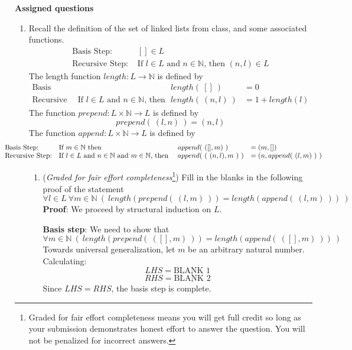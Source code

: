 \documentclass[12pt, oneside]{article}
\begin{document}
\newpage
{\bf Assigned questions}

\begin{enumerate}
    \item Recall the definition of the set of linked lists from class, and some associated functions.
    \[
        \begin{array}{ll}
        \textrm{Basis Step: } & [] \in L \\
        \textrm{Recursive Step: } & \textrm{If } l \in L\textrm{ and }n \in \mathbb{N} \textrm{, then } (n, l) \in L
        \end{array}
    \]
    The length function $length: L \to \mathbb{N}$ is defined by
    \[
        \begin{array}{llll}
        \textrm{Basis Step:} &  & length(~[]~) &= 0 \\
        \textrm{Recursive Step:} & \textrm{If } l \in L\textrm{ and }n \in \mathbb{N}\textrm{, then  } & length(~(n, l)~)  &= 1+ length(l)
        \end{array}
    \]
    The function $prepend : L \times \mathbb{N} \to L$ is defined by
    \[
        prepend(~(l, n)~) = (n, l)
    \]
    The function $append : L \times \mathbb{N} \to L$ is defined by
    \[
    \hspace{-40pt}\begin{array}{llll}
    \textrm{Basis Step:} & \textrm{If } m \in \mathbb{N}\textrm{ then } & append(~([], m)~) & = (m, []) \\
    \textrm{Recursive Step:} & \textrm{If } l \in L\textrm{ and }n \in \mathbb{N}\textrm{ and }m \in \mathbb{N}\textrm{, then  } & append(~(~(n, l), m~)~) &= (n, append(~(l, m)~)~)
    \end{array}
    \]
    \begin{enumerate}
        \item ({\it Graded for fair effort completeness}\footnote{Graded for fair effort completeness means 
        you will get full credit so long as your submission demonstrates honest 
        effort to answer the question. You will not be penalized for incorrect answers.}) Fill in the blanks in the following proof of the statement
        \[
            \forall l\in L~ \forall m \in \mathbb{N} ~(~length(prepend(~(l,m)~)) = length(append(~(l,m)~))~)
        \]
        {\bf Proof}: We proceed by structural induction on $L$.
        
        {\bf Basis step}: We need to show that 
        \[
            \forall m \in \mathbb{N}  ~(~length(prepend(~([],m)~)) = length(append(~([],m)~))~)
        \]
        Towards universal generalization, let $m$ be an arbitrary natural number. Calculating:
        \[
            LHS = \underline{\text{BLANK~1}}
        \]
        \[
            RHS = \underline{\text{BLANK~2}}
        \]
        Since $LHS = RHS$, the basis step is complete.


\end{enumerate}
\end{enumerate}
\end{document}
